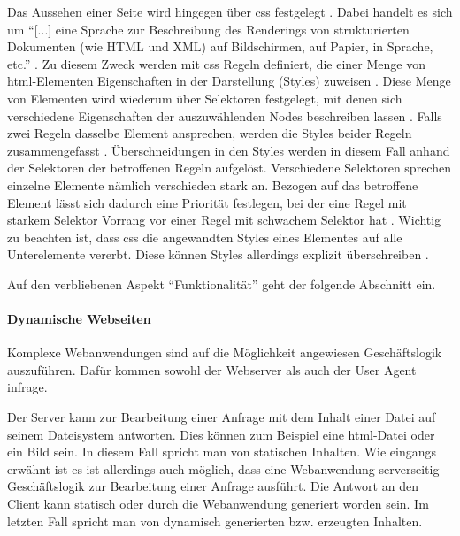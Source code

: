         Das Aussehen einer Seite wird hingegen über \gls{css} festgelegt \cite{w3c:css}.
        Dabei handelt es sich um "`[...] eine Sprache zur Beschreibung des Renderings
        von strukturierten Dokumenten (wie HTML und XML) auf Bildschirmen, auf Papier,
        in Sprache, etc."' \cite{w3c:css}.
        Zu diesem Zweck werden mit \gls{css} Regeln definiert,
        die einer Menge von \gls{html}-Elementen Eigenschaften in der Darstellung (Styles) zuweisen
        \cite{w3c:cssSyntax}.
        Diese Menge von Elementen wird wiederum über Selektoren festgelegt,
        mit denen sich verschiedene Eigenschaften der auszuwählenden Nodes beschreiben lassen
        \cite{w3c:cssSelectors}.
        Falls zwei Regeln dasselbe Element ansprechen,
        werden die Styles beider Regeln zusammengefasst
        \cite{w3c:cssCascading}.
        Überschneidungen in den Styles werden in diesem Fall anhand der Selektoren der betroffenen Regeln aufgelöst.
        Verschiedene Selektoren sprechen einzelne Elemente nämlich verschieden stark an.
        Bezogen auf das betroffene Element lässt sich dadurch eine Priorität festlegen,
        bei der eine Regel mit starkem Selektor Vorrang vor einer Regel mit schwachem Selektor hat
        \cite{w3c:cssSelectors}. 
        Wichtig zu beachten ist, dass \gls{css} die angewandten Styles eines Elementes auf alle Unterelemente vererbt.
        Diese können Styles allerdings explizit überschreiben
        \cite{w3c:cssCascading}.
        
        Auf den verbliebenen Aspekt "`Funktionalität"' geht der folgende Abschnitt ein.

        \paragraph*{Dynamische Webseiten}
        Komplexe Webanwendungen sind auf die Möglichkeit angewiesen Geschäftslogik auszuführen.
        Dafür kommen sowohl der Webserver als auch der User Agent infrage.

        Der Server kann zur Bearbeitung einer Anfrage mit dem Inhalt einer Datei auf seinem Dateisystem antworten.
        Dies können zum Beispiel eine \gls{html}-Datei oder ein Bild sein.
        In diesem Fall spricht man von statischen Inhalten.
        Wie eingangs erwähnt ist es ist allerdings auch möglich,
        dass eine Webanwendung serverseitig Geschäftslogik zur Bearbeitung einer Anfrage ausführt.
        Die Antwort an den Client kann statisch oder
        durch die Webanwendung generiert worden sein.
        Im letzten Fall spricht man von dynamisch generierten bzw. erzeugten Inhalten.

